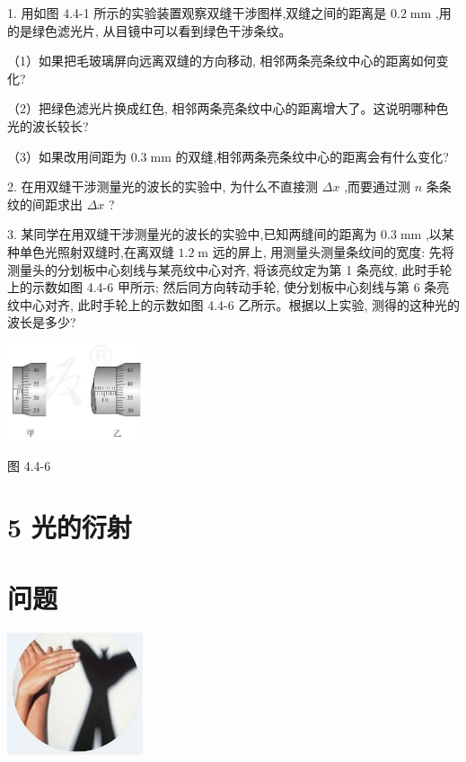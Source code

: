 \documentclass[10pt]{article}
\begin{document}
1. 用如图 4.4-1 所示的实验装置观察双缝干涉图样,双缝之间的距离是 \({0.2}\mathrm{\;{mm}}\) ,用的是绿色滤光片, 从目镜中可以看到绿色干涉条纹。

（1）如果把毛玻璃屏向远离双缝的方向移动, 相邻两条亮条纹中心的距离如何变化?

（2）把绿色滤光片换成红色, 相邻两条亮条纹中心的距离增大了。这说明哪种色光的波长较长?

（3）如果改用间距为 \({0.3}\mathrm{\;{mm}}\) 的双缝,相邻两条亮条纹中心的距离会有什么变化?

2. 在用双缝干涉测量光的波长的实验中, 为什么不直接测 \({\Delta x}\) ,而要通过测 \(n\) 条条纹的间距求出 \({\Delta x}\) ?

3. 某同学在用双缝干涉测量光的波长的实验中,已知两缝间的距离为 \({0.3}\mathrm{\;{mm}}\) ,以某种单色光照射双缝时,在离双缝 \({1.2}\mathrm{\;m}\) 远的屏上, 用测量头测量条纹间的宽度: 先将测量头的分划板中心刻线与某亮纹中心对齐, 将该亮纹定为第 1 条亮纹, 此时手轮上的示数如图 4.4-6 甲所示; 然后同方向转动手轮, 使分划板中心刻线与第 6 条亮纹中心对齐, 此时手轮上的示数如图 4.4-6 乙所示。根据以上实验, 测得的这种光的波长是多少?

\begin{center}
\includegraphics[max width=0.3\textwidth]{images/01910e4c-ebb8-7d2c-8f2f-2375bc1d2d12_108_920608.jpg}
\end{center}

图 4.4-6

\section*{5 光的衍射}

\section*{问题}

\begin{center}
\includegraphics[max width=0.3\textwidth]{images/01910e4c-ebb8-7d2c-8f2f-2375bc1d2d12_109_889390.jpg}
\end{center}
\end{document}
